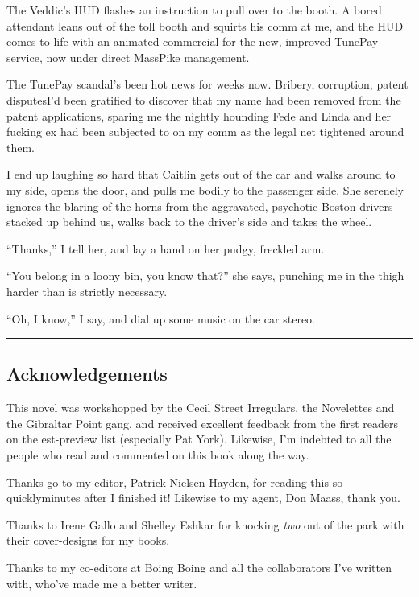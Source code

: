 The Veddic’s HUD flashes an instruction to pull over to the booth.
A bored attendant leans out of the toll booth and squirts his comm
at me, and the HUD comes to life with an animated commercial for
the new, improved TunePay service, now under direct MassPike
management.

The TunePay scandal’s been hot news for weeks now. Bribery,
corruption, patent disputes{\dash}I’d been gratified to discover that my
name had been removed from the patent applications, sparing me the
nightly hounding Fede and Linda and her fucking ex had been
subjected to on my comm as the legal net tightened around them.

I end up laughing so hard that Caitlin gets out of the car and
walks around to my side, opens the door, and pulls me bodily to the
passenger side. She serenely ignores the blaring of the horns from
the aggravated, psychotic Boston drivers stacked up behind us,
walks back to the driver’s side and takes the wheel.

“Thanks,” I tell her, and lay a hand on her pudgy, freckled arm.

“You belong in a loony bin, you know that?” she says, punching me
in the thigh harder than is strictly necessary.

“Oh, I know,” I say, and dial up some music on the car stereo.

\begin{center}\rule{3in}{0.4pt}\end{center}

\subsection{Acknowledgements}

This novel was workshopped by the Cecil Street Irregulars, the
Novelettes and the Gibraltar Point gang, and received excellent
feedback from the first readers on the est-preview list (especially
Pat York). Likewise, I’m indebted to all the people who read and
commented on this book along the way.

Thanks go to my editor, Patrick Nielsen Hayden, for reading this so
quickly{\dash}minutes after I finished it! Likewise to my agent, Don
Maass, thank you.

Thanks to Irene Gallo and Shelley Eshkar for knocking \emph{two}
out of the park with their cover-designs for my books.

Thanks to my co-editors at Boing Boing and all the collaborators
I’ve written with, who’ve made me a better writer.

